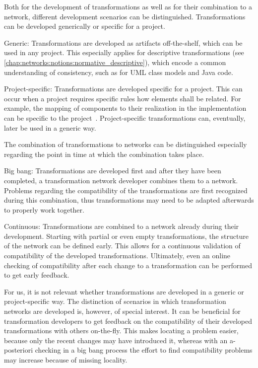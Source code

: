Both for the development of transformations as well as for their combination to a network, different development scenarios can be distinguished.
Transformations can be developed generically or specific for a project.
\begin{properdescription}
    \item[Generic:] Transformations are developed as artifacts off-the-shelf, which can be used in any project. This especially applies for descriptive transformations (see \autoref{chap:networks:notions:normative_descriptive}), which encode a common understanding of consistency, such as for \gls{UML} class models and Java code.
    \item[Project-specific:] Transformations are developed specific for a project. This can occur when a project requires specific rules how elements shall be related. For example, the mapping of components to their realization in the implementation can be specific to the project~\cite{langhammer2017a}. Project-specific transformations can, eventually, later be used in a generic way.
\end{properdescription}

The combination of transformations to networks can be distinguished especially regarding the point in time at which the combination takes place.
\begin{properdescription}
    \item[Big bang:] Transformations are developed first and after they have been completed, a transformation network developer combines them to a network. Problems regarding the compatibility of the transformations are first recognized during this combination, thus transformations may need to be adapted afterwards to properly work together.
    \item[Continuous:] Transformations are combined to a network already during their development. Starting with partial or even empty transformations, the structure of the network can be defined early. This allows for a continuous validation of compatibility of the developed transformations. Ultimately, even an online checking of compatibility after each change to a transformation can be performed to get early feedback.
\end{properdescription}

For us, it is not relevant whether transformations are developed in a generic or project-specific way.
The distinction of scenarios in which transformation networks are developed is, however, of special interest.
It can be beneficial for transformation developers to get feedback on the compatibility of their developed transformations with others on-the-fly.
This makes locating a problem easier, because only the recent changes may have introduced it, whereas with an a-posteriori checking in a big bang process the effort to find compatibility problems may increase because of missing locality.

